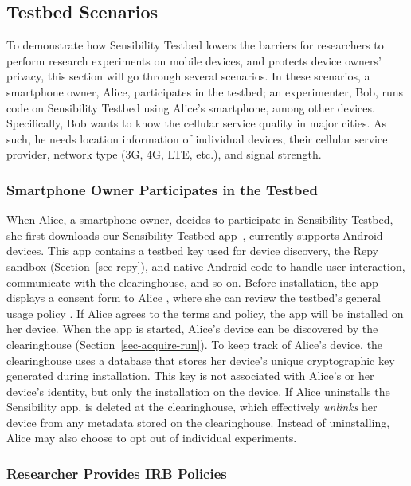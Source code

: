 \subsection{Testbed Scenarios}\label{sec-scenario}

To demonstrate how Sensibility Testbed lowers the barriers for
researchers to perform research experiments on mobile devices,
and protects device owners' privacy, this section will go
through several scenarios. In these scenarios, a smartphone owner, Alice,
participates in the testbed; an experimenter, Bob, runs code on
Sensibility Testbed using Alice's smartphone, among other
devices. Specifically, Bob wants to know the cellular service
quality in major cities. As such, he needs location information
of individual devices, their cellular service provider, network
type (3G, 4G, LTE, etc.), and signal strength.

\subsubsection{Smartphone Owner Participates in the Testbed}
\label{sec-owner-participate}

When Alice, a smartphone owner, decides to participate in
Sensibility Testbed, she first downloads our Sensibility Testbed
app~\cite{sensibility-app}, currently supports Android devices.
This app contains a testbed key  used for 
device discovery, the Repy sandbox (Section~\ref{sec-repy}), 
and native Android code to handle user interaction, communicate 
with the clearinghouse, and so on. Before installation, the app displays a
consent form to Alice , where she can review
the testbed's general usage policy . If Alice
agrees to the terms and policy, the app will be installed on her
device. When the app is started, Alice's device can be
discovered by the clearinghouse (Section~\ref{sec-acquire-run}). 
To keep track of Alice's device, the
clearinghouse uses a database that stores her device's unique
cryptographic key  generated during
installation. This key is not associated with Alice's or her
device's identity, but only the installation on the device. If
Alice uninstalls the Sensibility app,  is
deleted at the clearinghouse, which effectively \textit{unlinks}
her device from any metadata stored on the clearinghouse.
Instead of uninstalling, Alice may also choose to opt out of
individual experiments.

\subsubsection{Researcher Provides IRB
Policies}\label{sec-irb-policy}

